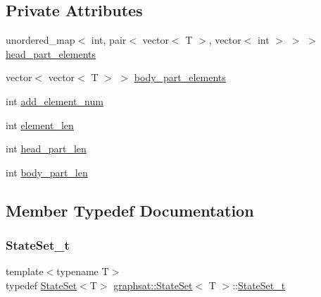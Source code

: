 \subsection*{Private Attributes}
\begin{DoxyCompactItemize}
\item 
unordered\+\_\+map$<$ int, pair$<$ vector$<$ T $>$, vector$<$ int $>$ $>$ $>$ \mbox{\hyperlink{classgraphsat_1_1_state_set_aa82adee471b2bd7245d92c08d0d24991}{head\+\_\+part\+\_\+elements}}
\item 
vector$<$ vector$<$ T $>$ $>$ \mbox{\hyperlink{classgraphsat_1_1_state_set_aea8d756f3a002b92c6ab86866ac1777d}{body\+\_\+part\+\_\+elements}}
\item 
int \mbox{\hyperlink{classgraphsat_1_1_state_set_abaedb0e8a95f8b933a58165d0e8b984d}{add\+\_\+element\+\_\+num}}
\item 
int \mbox{\hyperlink{classgraphsat_1_1_state_set_a195a71db13d33685ae4eba516d7bd4c3}{element\+\_\+len}}
\item 
int \mbox{\hyperlink{classgraphsat_1_1_state_set_a7d6ffe4819cda042a16fd46cac949010}{head\+\_\+part\+\_\+len}}
\item 
int \mbox{\hyperlink{classgraphsat_1_1_state_set_acc83de2b14bfcb1a0810d9bf3abb2ac5}{body\+\_\+part\+\_\+len}}
\end{DoxyCompactItemize}


\subsection{Member Typedef Documentation}
\mbox{\label{classgraphsat_1_1_state_set_a6474a59203fade7146aacfd0e277ecf4}} 
\subsubsection{\texorpdfstring{StateSet\_t}{StateSet\_t}}
{\footnotesize\ttfamily template$<$typename T$>$ \\
typedef \mbox{\hyperlink{classgraphsat_1_1_state_set}{State\+Set}}$<$T$>$ \mbox{\hyperlink{classgraphsat_1_1_state_set}{graphsat\+::\+State\+Set}}$<$ T $>$\+::\mbox{\hyperlink{classgraphsat_1_1_state_set_a6474a59203fade7146aacfd0e277ecf4}{State\+Set\+\_\+t}}\hspace{0.3cm}{\ttfamily [private]}}



